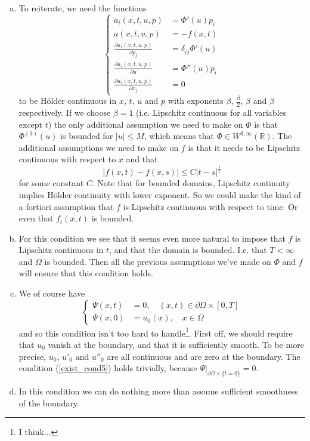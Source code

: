 \documentclass[11pt, a4paper]{article}
\begin{document}
\begin{enumerate}[a)]
	\item To reiterate, we need the functions
	\begin{equation*}
		\begin{cases}
			a_i(x,t,u,p) &= \Phi'(u)p_i \\
			a(x,t,u,p) &= -f(x,t) \\
			\frac{\partial a_i(x,t,u,p)}{\partial p_j} &= \delta_{ij}\Phi'(u) \\
			\frac{\partial a_i(x,t,u,p)}{\partial u} &= \Phi''(u)p_i \\
			\frac{\partial a_i(x,t,u,p)}{\partial x_j} &= 0
		\end{cases}
	\end{equation*}
	to be Hölder continuous in $x$, $t$, $u$ and $p$ with exponents $\beta$, $\frac{\beta}{2}$, $\beta$ and $\beta$ respectively. If we choose $\beta = 1$ (i.e. Lipschitz continuous for all variables except $t$) the only additional assumption we need to make on $\Phi$ is that $\Phi^{(3)}(u)$ is bounded for $|u| \leq M$, which means that $\Phi \in W^{3,\infty}(\mathbb{R})$. The additional assumptions we need to make on $f$ is that it needs to be Lipschitz continuous with respect to $x$ and that
	\begin{equation*}
	|f(x,t) - f(x,s)| \leq C|t-s|^\frac{1}{2}
	\end{equation*}
	for some constant $C$. Note that for bounded domains, Lipschitz continuity implies Hölder continuity with lower exponent. So we could make the kind of a fortiori assumption that $f$ is Lipschitz continuous with respect to time. Or even that $f_t(x,t)$ is bounded.
	
	\item For this condition we see that it seems even more natural to impose that $f$ is Lipschitz continuous in $t$, and that the domain is bounded. I.e. that $T<\infty$ and $\Omega$ is bounded. Then all the previous assumptions we've made on $\Phi$ and $f$ will ensure that this condition holds.
	
	\item We of course have
	\begin{equation*}
		\begin{cases}
		\Psi(x,t) &= 0, \quad (x,t) \in \partial \Omega \times [0,T] \\
		\Psi(x,0) &= u_0(x), \quad x\in \Omega 
		\end{cases}
	\end{equation*}
	and so this condition isn't too hard to handle\footnote{I think...}. First off, we should require that $u_0$ vanish at the boundary, and that it is sufficiently smooth. To be more precise, $u_0$, $u'_0$ and $u''_0$ are all continuous and are zero at the boundary. The condition (\ref{exist_cond5}) holds trivially, because  $\Psi\big|_{\partial \Omega \times \{t=0\}} = 0$.
	
	\item In this condition we can do nothing more than assume sufficient smoothness of the boundary.
\end{enumerate}
\end{document}

